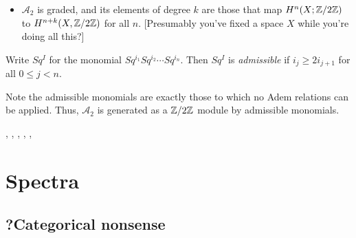 \documentclass{MetricNotes2023}
\def\inte{\ensuremath\mathbb{Z}}
\def\A{\ensuremath{\mathscr{A}_2}}
\begin{document}
\begin{itemize}
\item \(\mathscr A_2\) is graded, and its elements of degree \(k\) are those that map \(H^n(X; \inte/2\inte)\) to \(H^{n+k}(X, \inte/2\inte)\) for all \(n\). [Presumably you've fixed a space \(X\) while you're doing all this?]
\end{itemize}

\begin{definition}
Write \(Sq^I\) for the monomial \(Sq^{i_1}Sq^{i_2}\cdots Sq^{i_n}\). Then \(Sq^I\) is \textit{admissible} if \(i_j\geq 2i_{j+1}\) for all \(0\leq j < n\). 
\end{definition}

Note the admissible monomials are exactly those to which no Adem relations can be applied. Thus, \(\A\) is generated as a \(\inte/2\inte\) module by admissible monomials. 

\autocite{stable_homotopy}, \autocite{cobordism}, 
\autocite{ass}, \autocite{spectra}, \autocite{hatcher}, \autocite{foundations}

\section{Spectra}

\subsection{?Categorical nonsense}
\end{document}
